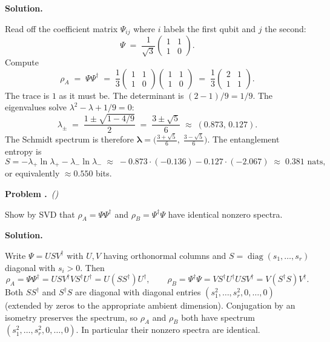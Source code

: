 \documentclass[11pt,a4paper]{article}
\newcounter{problem}
\newenvironment{problem}[1][]{%
  \refstepcounter{problem}%
  \par\medskip\noindent
  \textbf{Problem \theproblem.}\if\relax\detokenize{#1}\relax\else\ \textit{(#1)}\fi\quad\ignorespaces
}{\par\smallskip}
\newenvironment{solution}{%
  \par\noindent\textbf{Solution.}\quad\ignorespaces
}{\par\medskip}
\newcommand{\diag}{\operatorname{diag}}
\begin{document}
\begin{solution}
Read off the coefficient matrix $\Psi_{ij}$ where $i$ labels the
first qubit and $j$ the second:
\[
  \Psi \;=\; \frac{1}{\sqrt 3}\begin{pmatrix} 1 & 1 \\ 1 & 0 \end{pmatrix}.
\]
Compute
\[
  \rho_A \;=\; \Psi \Psi^\dagger
       \;=\; \frac{1}{3}\begin{pmatrix} 1 & 1 \\ 1 & 0 \end{pmatrix}
                       \begin{pmatrix} 1 & 1 \\ 1 & 0 \end{pmatrix}
       \;=\; \frac{1}{3}\begin{pmatrix} 2 & 1 \\ 1 & 1 \end{pmatrix}.
\]
The trace is $1$ as it must be.  The determinant is $(2 - 1)/9 = 1/9$.
The eigenvalues solve $\lambda^2 - \lambda + 1/9 = 0$:
\[
  \lambda_\pm \;=\; \frac{1 \pm \sqrt{1 - 4/9}}{2}
                \;=\; \frac{3 \pm \sqrt 5}{6}
                \;\approx\; (0.873,\, 0.127).
\]
The Schmidt spectrum is therefore
$\bm\lambda = \bigl(\tfrac{3 + \sqrt 5}{6},\; \tfrac{3 - \sqrt 5}{6}\bigr)$.
The entanglement entropy is
\[
  S = -\lambda_+ \ln \lambda_+ - \lambda_- \ln \lambda_-
    \;\approx\; -0.873 \cdot (-0.136) - 0.127 \cdot (-2.067)
    \;\approx\; 0.381 \text{ nats},
\]
or equivalently $\approx 0.550$ bits.
\end{solution}

\begin{problem}
Show by SVD that $\rho_A = \Psi\Psi^\dagger$ and
$\rho_B = \Psi^\dagger \Psi$ have identical nonzero spectra.
\end{problem}

\begin{solution}
Write $\Psi = U S V^\dagger$ with $U, V$ having orthonormal columns
and $S = \diag(s_1, \ldots, s_r)$ diagonal with $s_i > 0$.  Then
\[
  \rho_A = \Psi\Psi^\dagger = U S V^\dagger V S^\dagger U^\dagger
         = U (S S^\dagger) U^\dagger,
  \qquad
  \rho_B = \Psi^\dagger \Psi = V S^\dagger U^\dagger U S V^\dagger
         = V (S^\dagger S) V^\dagger.
\]
Both $S S^\dagger$ and $S^\dagger S$ are diagonal with diagonal
entries $(s_1^2, \ldots, s_r^2, 0, \ldots, 0)$ (extended by zeros to
the appropriate ambient dimension).  Conjugation by an isometry
preserves the spectrum, so $\rho_A$ and $\rho_B$ both have spectrum
$(s_1^2, \ldots, s_r^2, 0, \ldots, 0)$.  In particular their nonzero
spectra are identical.
\end{solution}
\end{document}
